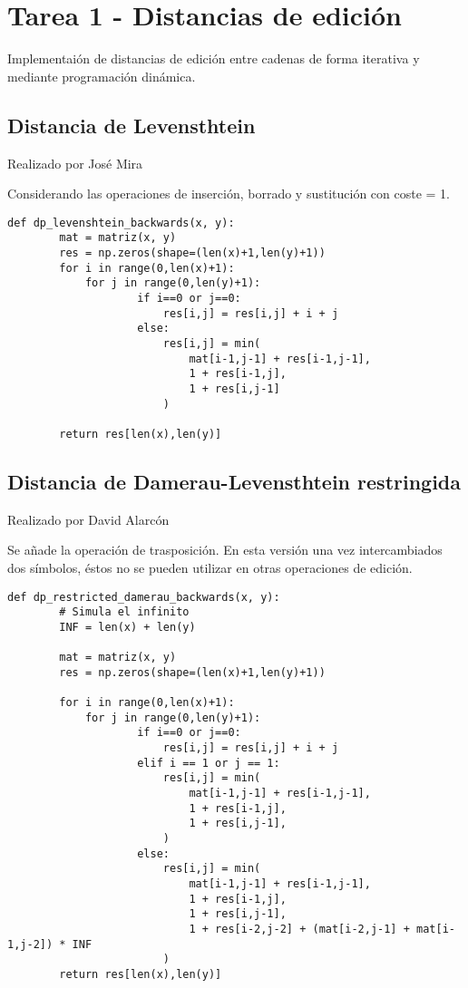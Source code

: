 \section{Tarea 1 - Distancias de edición}
Implementaión de distancias de edición entre cadenas de forma iterativa y mediante programación dinámica.

\subsection{Distancia de Levensthtein}
{\color{red}Realizado por José Mira}

Considerando las operaciones de inserción, borrado y sustitución con coste = 1.

\begin{lstlisting}[caption=Algoritmo distancia de levenshtein]
    def dp_levenshtein_backwards(x, y):
        mat = matriz(x, y)
        res = np.zeros(shape=(len(x)+1,len(y)+1))
        for i in range(0,len(x)+1):
            for j in range(0,len(y)+1):
                    if i==0 or j==0:
                        res[i,j] = res[i,j] + i + j
                    else:
                        res[i,j] = min(
                            mat[i-1,j-1] + res[i-1,j-1],
                            1 + res[i-1,j],
                            1 + res[i,j-1]
                        )

        return res[len(x),len(y)]
\end{lstlisting}


\subsection{Distancia de Damerau-Levensthtein restringida}
{\color{red}Realizado por David Alarcón}

Se añade la operación de trasposición. En esta versión una vez intercambiados dos
símbolos, éstos no se pueden utilizar en otras operaciones de edición.

\begin{lstlisting}[label={list:first},caption=Sample Python code -- Damerau-Levensthtein restringido]
    def dp_restricted_damerau_backwards(x, y):
        # Simula el infinito
        INF = len(x) + len(y)

        mat = matriz(x, y)
        res = np.zeros(shape=(len(x)+1,len(y)+1))

        for i in range(0,len(x)+1):
            for j in range(0,len(y)+1):
                    if i==0 or j==0:
                        res[i,j] = res[i,j] + i + j
                    elif i == 1 or j == 1:
                        res[i,j] = min(
                            mat[i-1,j-1] + res[i-1,j-1],
                            1 + res[i-1,j],
                            1 + res[i,j-1],
                        )
                    else:
                        res[i,j] = min(
                            mat[i-1,j-1] + res[i-1,j-1],
                            1 + res[i-1,j],
                            1 + res[i,j-1],
                            1 + res[i-2,j-2] + (mat[i-2,j-1] + mat[i-1,j-2]) * INF
                        )
        return res[len(x),len(y)]
\end{lstlisting}

